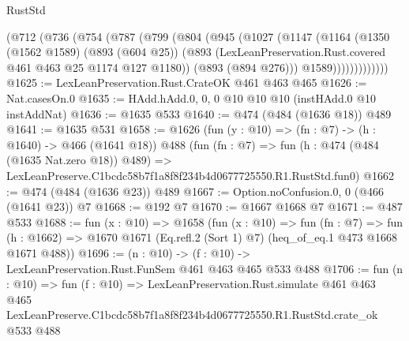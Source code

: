 \begin{lexlean}{RustStd}
\begin{coremodule}
          (@712
            (@736
              (@754
                (@787
                  (@799
                    (@804
                      (@945
                        (@1027
                          (@1147
                            (@1164
                              (@1350
                                (@1562 @1589)
                                (@893 (@604 @25))
                                (@893
                                  (LexLeanPreservation.Rust.covered @461 @463 @25 @1174 @127 @1180))
                                (@893 (@894 @276)))
                              @1589)))))))))))))
@1625 := LexLeanPreservation.Rust.CrateOK @461 @463 @465
@1626 := Nat.casesOn.{0}
@1635 := HAdd.hAdd.{0, 0, 0} @10 @10 @10 (instHAdd.{0} @10 instAddNat)
@1636 := @1635 @533
@1640 := @474 (@484 (@1636 @18)) @489
@1641 := @1635 @531
@1658 := @1626
    (fun (y : @10) => (fn : @7) -> (h : @1640) -> @466 (@1641 @18))
    @488
    (fun (fn : @7) =>
    fun (h : @474 (@484 (@1635 Nat.zero @18)) @489) =>
    LexLeanPreserve.C1bcdc58b7f1a8f8f234b4d0677725550.R1.RustStd.fun0)
@1662 := @474 (@484 (@1636 @23)) @489
@1667 := Option.noConfusion.{0, 0} (@466 (@1641 @23)) @7
@1668 := @192 @7
@1670 := @1667 @1668 @7
@1671 := @487 @533
@1688 := fun (x : @10) =>
  @1658
    (fun (x : @10) =>
    fun (fn : @7) =>
    fun (h : @1662) => @1670 @1671 (Eq.refl.{2} (Sort 1) @7) (heq_of_eq.{1} @473 @1668 @1671 @488))
@1696 := (n : @10) -> (f : @10) -> LexLeanPreservation.Rust.FunSem @461 @463 @465 @533 @488
@1706 := fun (n : @10) =>
  fun (f : @10) =>
  LexLeanPreservation.Rust.simulate
    @461
    @463
    @465
    LexLeanPreserve.C1bcdc58b7f1a8f8f234b4d0677725550.R1.RustStd.crate_ok
    @533
    @488
\end{coremodule}
\end{lexlean}
